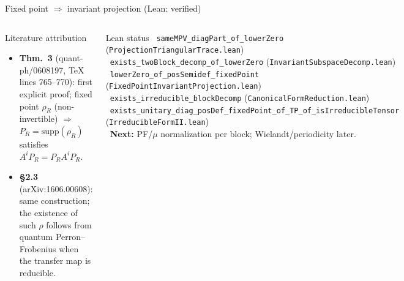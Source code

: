 \documentclass[aspectratio=169,10pt]{beamer}
\begin{document}
\begin{frame}{Fixed point $\Rightarrow$ invariant projection (Lean: verified)}
\begin{columns}[T]
        \begin{block}{Literature attribution}
            \begin{itemize}\itemsep0.18em
                \item \textbf{\cite{Perez-Garcia2007Matrix} Thm.~3}
                      (quant-ph/0608197, TeX lines 765--770):
                      first explicit proof; fixed point $\rho_R$ (non-invertible)
                      $\Rightarrow$ $P_R = \mathrm{supp}(\rho_R)$ satisfies
                      $A^i P_R = P_R A^i P_R$.
                \item \textbf{\cite{Cirac2017Annals} \S2.3}
                      (arXiv:1606.00608):
                      same construction; the existence of such $\rho$ follows
                      from quantum Perron--Frobenius when the transfer map
                      is reducible.
            \end{itemize}
        \end{block}

        \begin{block}{Lean status}
            {\scriptsize
            \textcolor{leangreen}{\checkmark}~\texttt{sameMPV\_diagPart\_of\_lowerZero}
              (\texttt{ProjectionTriangularTrace.lean})\\
            \textcolor{leangreen}{\checkmark}~\texttt{exists\_twoBlock\_decomp\_of\_lowerZero}
              (\texttt{InvariantSubspaceDecomp.lean})\\
            \textcolor{leangreen}{\checkmark}~\texttt{lowerZero\_of\_posSemidef\_fixedPoint}
              (\texttt{FixedPointInvariantProjection.lean})\\[0.35em]
            \textcolor{leangreen}{\checkmark}~\texttt{exists\_irreducible\_blockDecomp}
              (\texttt{CanonicalFormReduction.lean})~\cite{Cirac2017Annals,Cirac2017Irreducible}\\[0.2em]
            \textcolor{leangreen}{\checkmark}~\texttt{exists\_unitary\_diag\_posDef\_fixedPoint\_of\_TP\_of\_isIrreducibleTensor}
              (\texttt{IrreducibleFormII.lean})~\cite{Cirac2017Annals,Cirac2017Irreducible}\\[0.2em]
            \textcolor{amber}{\textbullet}~\textbf{Next:} PF/$\mu$ normalization per block;
              Wielandt/periodicity later.
            }
        \end{block}
    \end{columns}
\end{frame}
\end{document}
